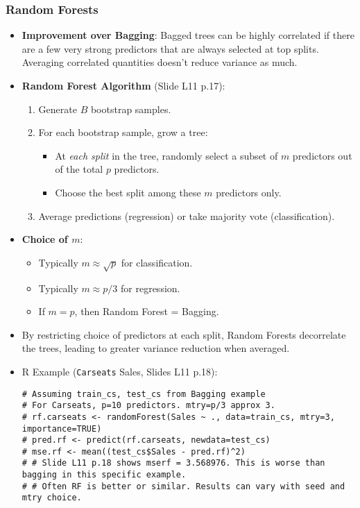 \documentclass[12pt,a4paper]{article}
\newcommand{\Robject}[1]{\texttt{#1}} %
\begin{document}
\begin{itemize}
    \subsubsection{Random Forests }
        \begin{itemize}
            \item \textbf{Improvement over Bagging}: Bagged trees can be highly correlated if there are a few very strong predictors that are always selected at top splits. Averaging correlated quantities doesn't reduce variance as much.
            \item \textbf{Random Forest Algorithm} (Slide L11 p.17):
                \begin{enumerate}
                    \item Generate $B$ bootstrap samples.
                    \item For each bootstrap sample, grow a tree:
                        \begin{itemize}
                            \item At \textit{each split} in the tree, randomly select a subset of $m$ predictors out of the total $p$ predictors.
                            \item Choose the best split among these $m$ predictors only.
                        \end{itemize}
                    \item Average predictions (regression) or take majority vote (classification).
                \end{enumerate}
            \item \textbf{Choice of $m$}:
                \begin{itemize}
                    \item Typically $m \approx \sqrt{p}$ for classification.
                    \item Typically $m \approx p/3$ for regression.
                    \item If $m=p$, then Random Forest = Bagging.
                \end{itemize}
            \item By restricting choice of predictors at each split, Random Forests decorrelate the trees, leading to greater variance reduction when averaged.
            \item R Example (\Robject{Carseats} Sales, Slides L11 p.18):
\begin{lstlisting}[caption={Random Forest with randomForest Package (Slide L11 p.18)}]
# Assuming train_cs, test_cs from Bagging example
# For Carseats, p=10 predictors. mtry=p/3 approx 3.
# rf.carseats <- randomForest(Sales ~ ., data=train_cs, mtry=3, importance=TRUE)
# pred.rf <- predict(rf.carseats, newdata=test_cs)
# mse.rf <- mean((test_cs$Sales - pred.rf)^2)
# # Slide L11 p.18 shows mserf = 3.568976. This is worse than bagging in this specific example.
# # Often RF is better or similar. Results can vary with seed and mtry choice.
\end{lstlisting}
        \end{itemize}


\end{itemize}
\end{document}
